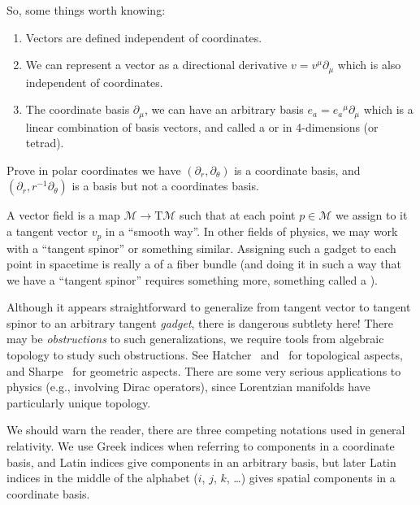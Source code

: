 So, some things worth knowing:
\begin{enumerate}
\item Vectors are defined independent of coordinates.
\item We can represent a vector as a directional derivative
  $v=v^{\mu}\partial_{\mu}$ which is also independent of
  coordinates.
\item The coordinate basis $\partial_{\mu}$, we can have an
  arbitrary basis $e_{a}={e_{a}}^{\mu}\partial_{\mu}$ which is a
  linear combination of basis vectors, and called a
   or
   in 4-dimensions (or tetrad).
\end{enumerate}

\begin{xca}
Prove in polar coordinates we have
$(\partial_{r},\partial_{\theta})$ is a coordinate basis, and
$(\partial_{r},r^{-1}\partial_{\theta})$ is a basis but not a
coordinates basis.
\end{xca}

A vector field is a map $\mathcal{M}\to\mathrm{T}\mathcal{M}$
such that at each point $p\in\mathcal{M}$ we assign to it a
tangent vector $v_{p}$ in a ``smooth way''. In other fields of
physics, we may work with a ``tangent spinor'' or something
similar. Assigning such a gadget to each point in spacetime is
really a  of a fiber bundle (and doing it in such
a way that we have a ``tangent spinor'' requires something more,
something called a ).

\begin{ddanger}
Although it appears straightforward to generalize from tangent
vector to tangent spinor to an arbitrary tangent \emph{gadget},
there is dangerous subtlety here! There may be
\emph{obstructions} to such generalizations, we require tools
from algebraic topology to study such obstructions. See
Hatcher~\cite[\normalfont\S4.3]{hatcher1} and~\cite{hatcher2} for
topological aspects, and Sharpe~\cite{sharpe} for geometric
aspects. There are some very serious applications to physics
(e.g., involving Dirac operators), since Lorentzian manifolds
have particularly unique topology. 
\end{ddanger}

We should warn the reader, there are three competing notations
used in general relativity. We use Greek indices when referring
to components in a coordinate basis, and Latin indices give
components in an arbitrary basis, but later Latin indices in the
middle of the alphabet ($i$, $j$, $k$, \dots) gives spatial
components in a coordinate basis.


